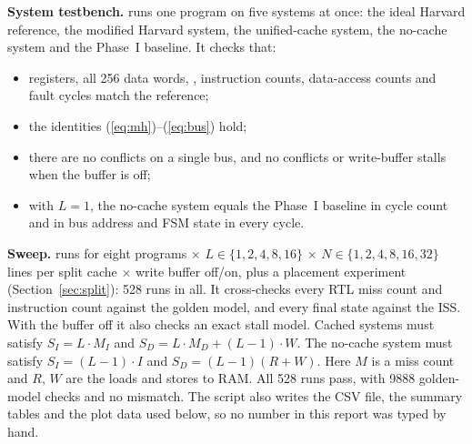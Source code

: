 \textbf{System testbench.}  runs one program on five systems at once: the ideal
Harvard reference, the modified Harvard system, the unified-cache system, the no-cache system
and the Phase~I baseline. It checks that:
\begin{itemize}
  \item registers, all 256 data words, , instruction counts, data-access counts
        and fault cycles match the reference;
  \item the identities (\ref{eq:mh})--(\ref{eq:bus}) hold;
  \item there are no conflicts on a single bus, and no conflicts or write-buffer stalls when the
        buffer is off;
  \item with $L=1$, the no-cache system equals the Phase~I baseline in cycle count and in bus
        address and FSM state in every cycle.
\end{itemize}

\textbf{Sweep.}  runs  for eight programs
$\times$ $L\in\{1,2,4,8,16\}$ $\times$ $N\in\{1,2,4,8,16,32\}$ lines per split cache
$\times$ write buffer off/on, plus a placement experiment (Section~\ref{sec:split}): 528 runs in
all. It cross-checks every RTL miss count and instruction count against the golden model, and
every final state against the ISS. With the buffer off it also checks an exact stall model.
Cached systems must satisfy $S_I = L\cdot M_I$ and $S_D = L\cdot M_D + (L-1)\cdot W$. The
no-cache system must satisfy $S_I = (L-1)\cdot I$ and $S_D=(L-1)(R+W)$. Here $M$ is a miss count
and $R$, $W$ are the loads and stores to RAM. All 528 runs pass, with 9888 golden-model checks
and no mismatch. The script also writes the CSV file, the summary tables and the plot data used
below, so no number in this report was typed by hand.
